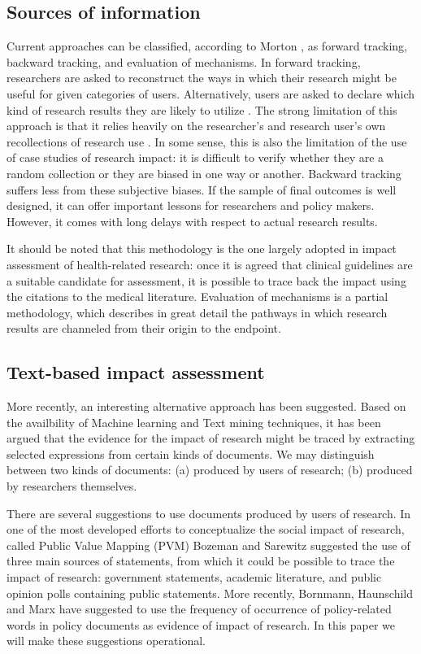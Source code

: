 \documentclass[]{book}
\begin{document}
\subsection{Sources of information}\label{sources-of-information}

Current approaches can be classified, according to Morton
\citep{morton2015progressing}, as forward tracking, backward tracking,
and evaluation of mechanisms. In forward tracking, researchers are asked
to reconstruct the ways in which their research might be useful for
given categories of users. Alternatively, users are asked to declare
which kind of research results they are likely to utilize
\citep{tang2000pilot}. The strong limitation of this approach is that it
relies heavily on the researcher's and research user's own recollections
of research use \citep{nutley2007using, donovan2011state}. In some
sense, this is also the limitation of the use of case studies of
research impact: it is difficult to verify whether they are a random
collection or they are biased in one way or another. Backward tracking
suffers less from these subjective biases. If the sample of final
outcomes is well designed, it can offer important lessons for
researchers and policy makers. However, it comes with long delays with
respect to actual research results.

It should be noted that this methodology is the one largely adopted in
impact assessment of health-related research: once it is agreed that
clinical guidelines are a suitable candidate for assessment, it is
possible to trace back the impact using the citations to the medical
literature. Evaluation of mechanisms is a partial methodology, which
describes in great detail the pathways in which research results are
channeled from their origin to the endpoint.

\subsection{Text-based impact
assessment}\label{text-based-impact-assessment}

More recently, an interesting alternative approach has been suggested.
Based on the availbility of Machine learning and Text mining techniques,
it has been argued that the evidence for the impact of research might be
traced by extracting selected expressions from certain kinds of
documents. We may distinguish between two kinds of documents: (a)
produced by users of research; (b) produced by researchers themselves.

There are several suggestions to use documents produced by users of
research. In one of the most developed efforts to conceptualize the
social impact of research, called Public Value Mapping (PVM) Bozeman and
Sarewitz \citep{bozeman2011public} suggested the use of three main
sources of statements, from which it could be possible to trace the
impact of research: government statements, academic literature, and
public opinion polls containing public statements. More recently,
Bornmann, Haunschild and Marx \citep{bornmann2016policy} have suggested
to use the frequency of occurrence of policy-related words in policy
documents as evidence of impact of research. In this paper we will make
these suggestions operational.
\end{document}
